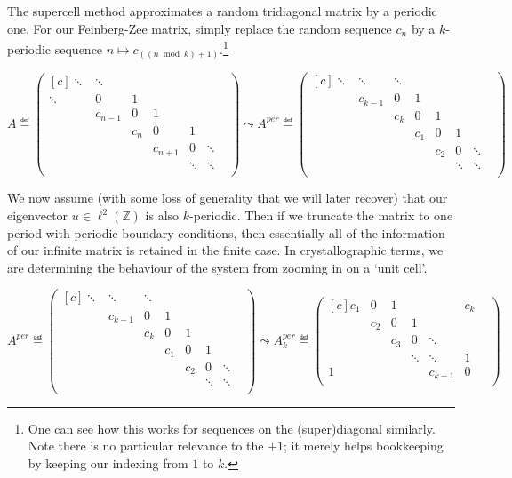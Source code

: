 \documentclass[../main.tex]{subfiles}
\begin{document}
The supercell method approximates a random tridiagonal matrix by a periodic one.
For our Feinberg-Zee matrix, simply replace the random sequence $c_n$ by a
$k$-periodic sequence $n \mapsto c_{((n \bmod k )+ 1)}$.\footnote{One can see
how this works for sequences on the (super)diagonal similarly. Note there is no
particular relevance to the $+1$; it merely helps bookkeeping by keeping our
indexing from $1$ to $k$.}

  $$ 
  A \eqdef
  \begin{pmatrix*}[c]
    \ddots & \ddots & & & & \\
    \ddots & 0 & 1 & & & \\
    & c_{n-1} & 0 & 1 & & \\
    & & c_{n} & 0 & 1 & \\
    & & & c_{n+1} & 0 & \ddots \\
    & & & & \ddots & \ddots & \\
  \end{pmatrix*}
  \leadsto 
  A^{per} \eqdef
  \begin{pmatrix*}[c]
    \ddots & \ddots & \ddots & & & &\\
    & c_{k-1} & 0 & 1 & & & &\\
    & & c_{k} & 0 & 1 & & &\\
    & & & c_1 & 0 & 1 & \\
    & & &  & c_2 & 0 & \ddots \\
    & & & & & \ddots & \ddots & \\ \end{pmatrix*} $$

We now assume (with some loss of generality that we will later recover) that our
eigenvector $u \in \ell^2(\mathbb{Z})$ is also $k$-periodic. Then if we truncate
the matrix to one period with periodic boundary conditions, then essentially all
of the information of our infinite matrix is retained in the finite case. In
crystallographic terms, we are determining the behaviour of the system from
zooming in on a `unit cell'.

\begin{equation}
\label{eqn:periodising}
  A^{per} \eqdef
  \begin{pmatrix*}[c]
    \ddots & \ddots & \ddots & & & & \\
    & c_{k-1} & 0 & 1 & & & & \\
    & & c_{k} & 0 & 1 & & & \\
    & & & c_1 & 0 & 1 & \\
    & & &  & c_2 & 0 & \ddots \\
    & & & & & \ddots & \ddots & \\
  \end{pmatrix*}
  \leadsto 
  A^{per}_k \eqdef
  \begin{pmatrix*}[c]
    c_1 & 0 & 1 & & & c_{k}\\
    & c_2 & 0 & 1 & & & \\
    & & c_3 & 0 & \ddots & & \\
    & & & \ddots & \ddots & 1 & \\
    1 & & & & c_{k-1} & 0\\ 
  \end{pmatrix*}
\end{equation}
\end{document}
